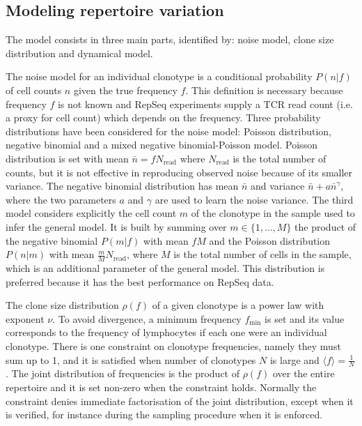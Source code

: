 \documentclass[a4paper,twocolumn]{article}
\begin{document}


\subsection{Modeling repertoire variation}
The model consists in three main parts, identified by: noise model, clone size distribution and dynamical model.

The noise model for an individual clonotype is a conditional probability $P(n|f)$ of cell counts $n$ given the true frequency $f$. This definition is necessary because frequency $f$ is not known and RepSeq experiments supply a TCR read count (i.e. a proxy for cell count) which depends on the frequency.
Three probability distributions have been considered for the noise model: Poisson distribution, negative binomial and a mixed negative binomial-Poisson model. Poisson distribution is set with mean $\bar{n} = f N_\mathrm{read}$ where $N_\mathrm{read}$ is the total number of counts, but it is not effective in reproducing observed noise because of its smaller variance. The negative binomial distribution has mean $\bar{n}$ and variance $\bar{n} + a \bar{n}^\gamma$, where the two parameters $a$ and $\gamma$ are used to learn the noise variance. The third model considers explicitly the cell count $m$ of the clonotype in the sample used to infer the general model. It is built by summing over $m \in \{1, \dots, M\}$ the product of the negative binomial $P(m|f)$ with mean $f M$ and the Poisson distribution $P(n|m)$ with mean $\frac{m}{M} N_\mathrm{read}$, where $M$ is the total number of cells in the sample, which is an additional parameter of the general model. This distribution is preferred because it has the best performance on RepSeq data.

The clone size distribution $\rho(f)$ of a given clonotype is a power law with exponent $\nu$. To avoid divergence, a minimum frequency $f_\mathrm{min}$ is set and its value corresponds to the frequency of lymphocytes if each one were an individual clonotype. There is one constraint on clonotype frequencies, namely they must sum up to 1, and it is satisfied when number of clonotypes $N$ is large and $\langle f \rangle = \frac{1}{N}$.
The joint distribution of frequencies is the product of $\rho(f)$ over the entire repertoire and it is set non-zero when the constraint holds. Normally the constraint denies immediate factorisation of the joint distribution, except when it is verified, for instance during the sampling procedure when it is enforced.
\end{document}
